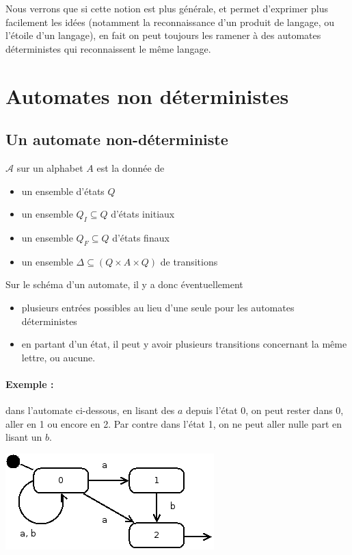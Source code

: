 \documentclass[10pt,twoside]{article}
\begin{document}
Nous verrons que si cette notion est plus générale, et permet
d'exprimer plus facilement les idées (notamment la reconnaissance d'un
produit de langage, ou l'étoile d'un langage), en fait on peut
toujours les ramener à des automates déterministes qui reconnaissent
le même langage.

\clearpage
\section{Automates non déterministes}


\subsection{Un automate non-déterministe} $\mathcal{A}$ sur un alphabet $A$
est la donnée de 
\begin{itemize}
\item un ensemble d'états $Q$
\item un ensemble $Q_I \subseteq Q$ d'états initiaux
\item un ensemble $Q_F \subseteq Q$ d'états finaux
\item un ensemble $\Delta \subseteq (Q \times A \times Q)$  de transitions
\end{itemize}

Sur le schéma d'un automate, il y a donc éventuellement
\begin{itemize}
\item plusieurs entrées possibles au lieu d'une seule pour les automates déterministes
\item en partant d'un état, il peut y avoir plusieurs transitions concernant la même lettre, ou aucune.
\end{itemize}

\paragraph{Exemple : } dans l'automate ci-dessous, en lisant des $a$ depuis l'état 0, on peut rester dans 0, aller en 1 ou encore en 2. Par contre dans l'état 1, on ne peut aller nulle part en lisant un $b$. 


\begin{center}
\includegraphics[width=.6\linewidth]{../dia/nondet}
\end{center}
\end{document}

